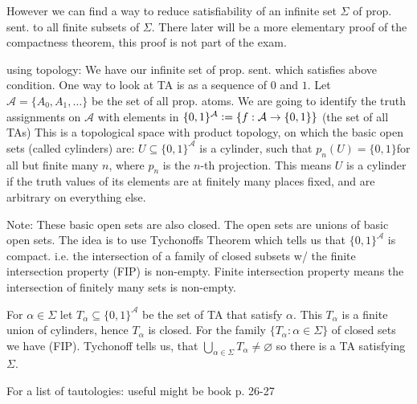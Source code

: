 However we can find a way to reduce satisfiability of an infinite set $\Sigma$ of prop. sent. to all finite subsets of $\Sigma$.
There later will be a more elementary proof of the compactness theorem, this proof is not part of the exam.
{
    using topology: We have our infinite set of prop. sent. which satisfies above condition. One way to look at TA is as a sequence of $0$ and $1$.
    Let $\mathcal{A} = \{A_0, A_1,\dots\}$ be the set of all prop. atoms. We are going to identify the truth assignments on $\mathcal{A}$
    with elements in $\{0,1\}^\mathcal{A}\vcentcolon= \{f: \mathcal{A}\to \{0,1\}\}$ (the set of all TAs)
    This is a topological space with product topology, on which 
    the basic open sets (called cylinders) are:
    $ U\subseteq \{0,1\}^\mathcal{A}$ is a cylinder, such that $p_n(U) = \{0,1\}$for all but finite many $n$, where $p_n$ is the $n$-th projection.
    This means $U$ is a cylinder if the truth values of its elements are at finitely many places fixed, and are arbitrary on everything else.
    
    Note: These basic open sets are also closed.
    The open sets are unions of basic open sets.
    The idea is to use Tychonoffs Theorem which tells us that $\{0,1\}^\mathcal{A}$ is compact. i.e.
    the intersection of a family of closed subsets w/ the finite intersection property (FIP) is non-empty.
    Finite intersection property means the intersection of finitely many sets is non-empty.

    For $\alpha \in \Sigma$ let $T_\alpha \subseteq \{0,1\}^\mathcal{A}$ be the set of TA that satisfy $\alpha$.
    This $T_\alpha$ is a finite union of cylinders, hence $T_\alpha$ is closed.
    For the family $\{T_\alpha: \alpha\in\Sigma\}$ of closed sets we have (FIP). Tychonoff tells us, 
    that $\bigcup_{\alpha\in\Sigma}{T_\alpha}\neq \varnothing$ so there is a TA satisfying $\Sigma$.}
    
    For a list of tautologies: useful might be book p. 26-27
